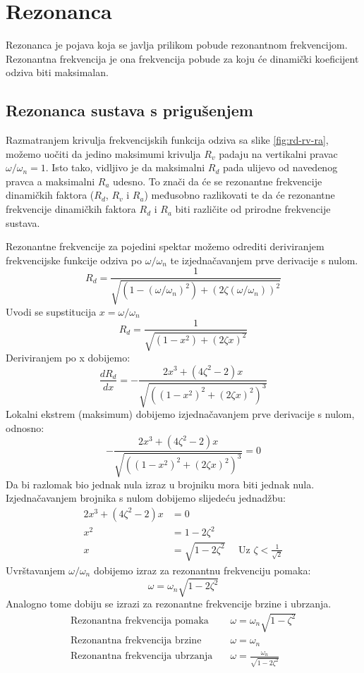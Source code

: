 \section{Rezonanca}
Rezonanca je pojava koja se javlja prilikom pobude rezonantnom frekvencijom.
Rezonantna frekvencija je ona frekvencija pobude za koju će dinamički koeficijent
odziva biti maksimalan. 
\par

\subsection{Rezonanca sustava s prigušenjem}
Razmatranjem krivulja frekvencijskih funkcija odziva sa slike 
\ref{fig:rd-rv-ra}, možemo uočiti da jedino maksimumi krivulja $R_v$ padaju na 
vertikalni pravac $\omega/\omega_n=1$. Isto tako, vidljivo je da maksimalni $R_d$
pada ulijevo od navedenog pravca a maksimalni $R_a$ udesno. To znači da će se 
rezonantne frekvencije dinamičkih faktora ($R_d$, $R_v$ i $R_a$) međusobno razlikovati 
te da će rezonantne frekvencije dinamičkih faktora $R_d$ i $R_a$ biti različite od
prirodne frekvencije sustava.

Rezonantne frekvencije za pojedini spektar možemo odrediti deriviranjem frekvencijske 
funkcije odziva po $\omega/\omega_n$ te izjednačavanjem prve derivacije s
nulom.
\[
    R_d = \frac{1}{\sqrt{(1-(\omega/\omega_n)^2) + (2\zeta(\omega/\omega_n))^2}}
\]
Uvodi se supstitucija $x=\omega/\omega_n$
\[
    R_d = \frac{1}{\sqrt{(1-x^2)+(2\zeta x)^2}}
\]
Deriviranjem po x dobijemo:
\[
    \frac{dR_d}{dx}=-\frac{2x^3+(4\zeta^2-2)x}{\sqrt{((1-x^2)^2+(2\zeta x)^2)^3}}
\]
Lokalni ekstrem (maksimum) dobijemo izjednačavanjem prve derivacije s nulom,
odnosno:
\[
    -\frac{2x^3+(4\zeta^2-2)x}{\sqrt{((1-x^2)^2+(2\zeta x)^2)^3}} = 0
\]
Da bi razlomak bio jednak nula izraz u brojniku mora biti jednak nula.
Izjednačavanjem brojnika s nulom dobijemo slijedeću jednadžbu:
\[
    \begin{aligned}
        2x^3+(4\zeta^2-2)x &= 0\\
        x^2 &= 1-2\zeta^2\\
        x &= \sqrt{1-2\zeta^2} \quad \text{ Uz } \zeta < \frac{1}{\sqrt{2}}
    \end{aligned}
\]
Uvrštavanjem $\omega/\omega_n$ dobijemo izraz za rezonantnu frekvenciju pomaka:
\begin{equation}\label{eq:rezonantna_frekvencija_pomak}
    \omega=\omega_n\sqrt{1-2\zeta^2}
\end{equation}
Analogno tome dobiju se izrazi za rezonantne frekvencije brzine i ubrzanja.
\begin{align}
    \text{Rezonantna frekvencija pomaka}\quad & \omega = \omega_n\sqrt{1-\zeta^2}\label{eq:rd_rezonanca}\\
    \text{Rezonantna frekvencija brzine}\quad & \omega = \omega_n\label{eq:rv_rezonanca}\\
    \text{Rezonantna frekvencija ubrzanja}\quad & \omega = \frac{\omega_n}{\sqrt{1-2\zeta^2}}\label{eq:ra_rezonanca}
\end{align}

